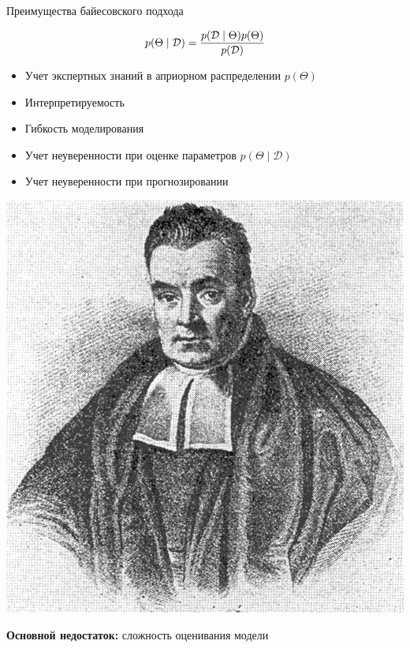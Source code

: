 \documentclass[12pt]{beamer}
\newcommand{\cond}{\;|\;}
\begin{document}
\begin{frame}{Преимущества байесовского подхода}
\begin{minipage}{0.6\linewidth}
	\[\small p(\Theta\cond\mathcal{D}) =
	\frac
	{p(\mathcal{D}\cond\Theta)p(\Theta)}
	{p(\mathcal{D})}\]
	\begin{itemize}
		\item Учет экспертных знаний в априорном распределении $p(\Theta)$
		\item Интерпретируемость
		\item Гибкость моделирования
		\item Учет неуверенности при оценке параметров $p(\Theta\cond\mathcal{D})$
		\item Учет неуверенности при прогнозировании
	\end{itemize}
\end{minipage}
\begin{minipage}{0.38\linewidth}
	\includegraphics[width=\linewidth]{bayes}
\end{minipage}
\textbf{Основной недостаток:} сложность оценивания модели
\end{frame}
\end{document}
